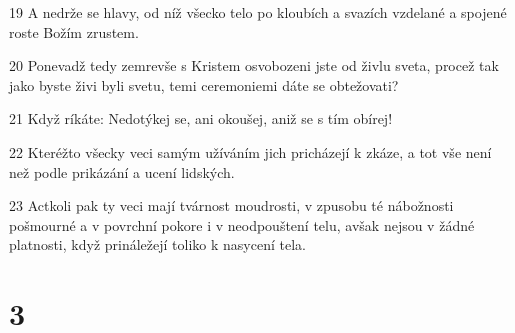 \par 19 A nedrže se hlavy, od níž všecko telo po kloubích a svazích vzdelané a spojené roste Božím zrustem.
\par 20 Ponevadž tedy zemrevše s Kristem osvobozeni jste od živlu sveta, procež tak jako byste živi byli svetu, temi ceremoniemi dáte se obtežovati?
\par 21 Když ríkáte: Nedotýkej se, ani okoušej, aniž se s tím obírej!
\par 22 Kteréžto všecky veci samým užíváním jich pricházejí k zkáze, a tot vše není než podle prikázání a ucení lidských.
\par 23 Actkoli pak ty veci mají tvárnost moudrosti, v zpusobu té nábožnosti pošmourné a v povrchní pokore i v neodpouštení telu, avšak nejsou v žádné platnosti, když prináležejí toliko k nasycení tela.

\chapter{3}

